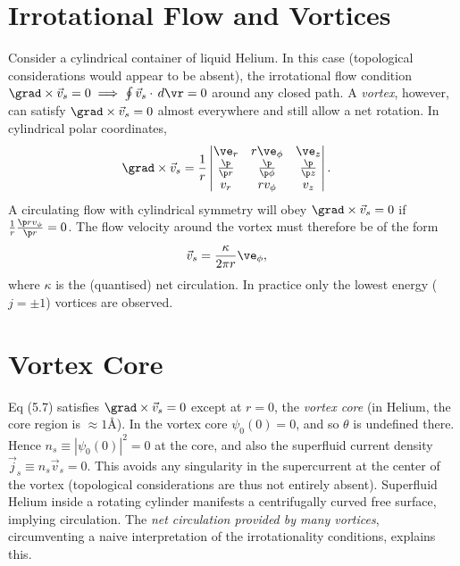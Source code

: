 \documentclass[a4paper, 11pt, normalem]{report}
\begin{document}
\section{Irrotational Flow and Vortices}
Consider a cylindrical container of liquid Helium.
In this case (topological considerations would appear to be absent), the irrotational flow condition $\grad\times\vec{v}_s=0\implies\oint\vec{v}_s\cdot\,d\vr=0$ around any closed path.
A \emph{vortex}, however, can satisfy $\grad\times\vec{v}_s=0$ almost everywhere and still allow a net rotation.
In cylindrical polar coordinates,
\begin{align}
    \grad\times\vec{v}_s &= \frac{1}{r}\begin{vmatrix}\ve_r & r\ve_\phi & \ve_z \\ \frac{\p}{\p r} & \frac{\p}{\p\phi} & \frac{\p}{\p z} \\ v_r & rv_\phi & v_z\end{vmatrix}.
\end{align}
A circulating flow with cylindrical symmetry will obey $\grad\times\vec{v}_s=0$ if $\frac{1}{r}\frac{\p rv_\phi}{\p r}=0$.
The flow velocity around the vortex must therefore be of the form
\begin{align}
    \vec{v}_s &= \frac{\kappa}{2\pi r}\ve_\phi,
\end{align}
where $\kappa$ is the (quantised) net circulation.
In practice only the lowest energy ($j=\pm1$) vortices are observed.

\section{Vortex Core}
Eq (5.7) satisfies $\grad\times\vec{v}_s=0$ except at $r=0$, the \emph{vortex core} (in Helium, the core region is $\approx1$\AA).
In the vortex core $\psi_0(0)=0$, and so $\theta$ is undefined there.
Hence $n_s\equiv|\psi_0(0)|^2=0$ at the core, and also the superfluid current density $\vec{j}_s\equiv n_s\vec{v}_s=0$.
This avoids any singularity in the supercurrent at the center of the vortex (topological considerations are thus not entirely absent).
Superfluid Helium inside a rotating cylinder manifests a centrifugally curved free surface, implying circulation.
The \emph{net circulation provided by many vortices}, circumventing a naive interpretation of the irrotationality conditions, explains this.
\end{document}
